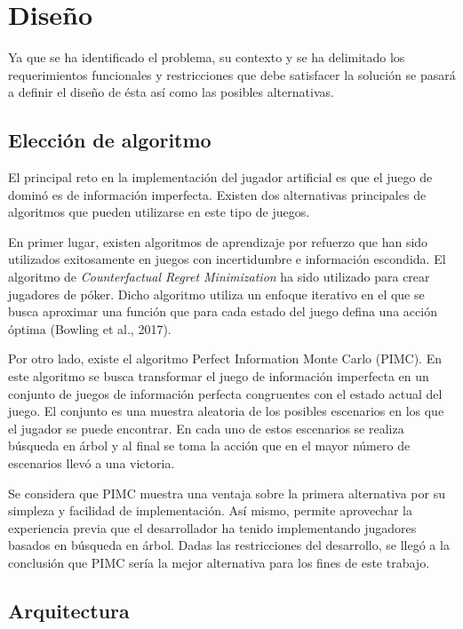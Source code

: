 \chapter{Diseño}

\noindent

Ya que se ha identificado el problema, su contexto y se ha delimitado los
requerimientos funcionales y restricciones que debe satisfacer la solución se
pasará a definir el diseño de ésta así como las posibles alternativas.

\section{Elección de algoritmo}

El principal reto en la implementación del jugador artificial es que el juego de
dominó es de información imperfecta. Existen dos alternativas principales de
algoritmos que pueden utilizarse en este tipo de juegos.

En primer lugar, existen algoritmos de aprendizaje por refuerzo que han sido
utilizados exitosamente en juegos con incertidumbre e información escondida. El
algoritmo de \textit{Counterfactual Regret Minimization} ha sido utilizado para
crear jugadores de póker. Dicho algoritmo utiliza un enfoque iterativo en el que
se busca aproximar una función que para cada estado del juego defina una acción
óptima (Bowling et al., 2017).

Por otro lado, existe el algoritmo Perfect Information Monte Carlo (PIMC). En
este algoritmo se busca transformar el juego de información imperfecta en un
conjunto de juegos de información perfecta congruentes con el estado actual del
juego. El conjunto es una muestra aleatoria de los posibles escenarios en los
que el jugador se puede encontrar. En cada uno de estos escenarios se realiza
búsqueda en árbol y al final se toma la acción que en el mayor número de
escenarios llevó a una victoria.

Se considera que PIMC muestra una ventaja sobre la primera alternativa por su
simpleza y facilidad de implementación. Así mismo, permite aprovechar la
experiencia previa que el desarrollador ha tenido implementando jugadores
basados en búsqueda en árbol. Dadas las restricciones del desarrollo, se llegó a
la conclusión que PIMC sería la mejor alternativa para los fines de este
trabajo.

\section{Arquitectura}


